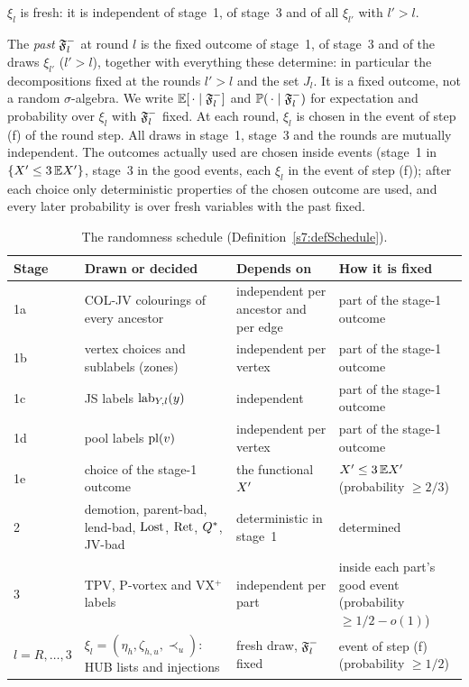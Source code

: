 \begin{definition}
\begin{itemize}
$\xi_l$ is fresh: it is independent of stage~1, of stage~3 and of all $\xi_{l'}$
with $l'>l$.
\end{itemize}
The \emph{past} $\mathfrak{F}^{-}_l$ at round $l$ is the fixed outcome of stage~1, of
stage~3 and of the draws $\xi_{l'}$ ($l'>l$), together with everything these
determine: in particular the decompositions fixed at the rounds $l'>l$ and the
set $J_l$. It is a fixed outcome, not a random $\sigma$-algebra. We write
$\mathbb{E}[\,\cdot\mid\mathfrak{F}^{-}_l]$ and $\mathbb{P}(\,\cdot\mid\mathfrak{F}^{-}_l)$ for expectation and
probability over $\xi_l$ with $\mathfrak{F}^{-}_l$ fixed. At each round, $\xi_l$ is chosen in
the event of step (f) of the round step. All draws in stage~1, stage~3 and the
rounds are mutually independent. The outcomes actually used are chosen inside
events (stage~1 in $\{X'\le3\,\mathbb{E}X'\}$, stage~3 in the good events, each
$\xi_l$ in the event of step (f)); after each choice only deterministic
properties of the chosen outcome are used, and every later probability is over
fresh variables with the past fixed.
\deps{\ref{s3:defCOL}, \ref{s5:defZones}, \ref{s7:defPool}, \ref{s6:defLending}, \ref{s5:defStages}, \ref{s7:defCand}, \ref{s4:lemTPV}, \ref{s4:lemPV}, \ref{s4:thmVXp}, \ref{s5:lemChild}, \ref{s5:lemDemoted}}
\end{definition}

\begin{table}[ht]
\centering
\small
\begin{tabular}{|p{1.5cm}|p{5.9cm}|p{3.6cm}|p{3.8cm}|}
\hline
\textbf{Stage} & \textbf{Drawn or decided} & \textbf{Depends on} & \textbf{How it is fixed}\\
\hline
1a & COL-JV colourings of every ancestor & independent per ancestor and per edge & part of the stage-1 outcome\\
1b & vertex choices and sublabels (zones) & independent per vertex & part of the stage-1 outcome\\
1c & JS labels $\mathrm{lab}_{Y,l}(y)$ & independent & part of the stage-1 outcome\\
1d & pool labels $\mathrm{pl}(v)$ & independent per vertex & part of the stage-1 outcome\\
1e & choice of the stage-1 outcome & the functional $X'$ & $X'\le3\,\mathbb{E}X'$ (probability $\ge2/3$)\\
\hline
2 & demotion, parent-bad, lend-bad, $\mathrm{Lost}$, $\mathrm{Ret}$, $Q^{*}$, JV-bad & deterministic in stage~1 & determined\\
\hline
3 & TPV, P-vortex and VX$^+$ labels & independent per part & inside each part's good event (probability $\ge1/2-o(1)$)\\
\hline
$l=R,\dots,3$ & $\xi_l=(\eta_h,\zeta_{h,u},\prec_u)$: HUB lists and injections & fresh draw, $\mathfrak{F}^{-}_l$ fixed & event of step (f) (probability $\ge1/2$)\\
\hline
\end{tabular}
\caption{The randomness schedule (Definition~\ref{s7:defSchedule}).}
\label{s7:tabSchedule}
\end{table}

